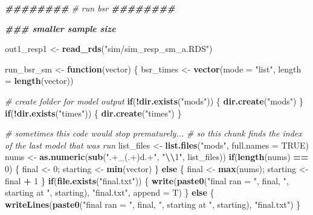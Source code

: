\documentclass[12pt, twoside]{amherstthesis}
\newenvironment{Shaded}{\begin{snugshade}}{\end{snugshade}}
\newcommand{\AttributeTok}[1]{\textcolor[rgb]{0.13,0.29,0.53}{#1}}
\newcommand{\CommentTok}[1]{\textcolor[rgb]{0.56,0.35,0.01}{\textit{#1}}}
\newcommand{\ConstantTok}[1]{\textcolor[rgb]{0.56,0.35,0.01}{#1}}
\newcommand{\ControlFlowTok}[1]{\textcolor[rgb]{0.13,0.29,0.53}{\textbf{#1}}}
\newcommand{\DecValTok}[1]{\textcolor[rgb]{0.00,0.00,0.81}{#1}}
\newcommand{\DocumentationTok}[1]{\textcolor[rgb]{0.56,0.35,0.01}{\textbf{\textit{#1}}}}
\newcommand{\FunctionTok}[1]{\textcolor[rgb]{0.13,0.29,0.53}{\textbf{#1}}}
\newcommand{\NormalTok}[1]{#1}
\newcommand{\OtherTok}[1]{\textcolor[rgb]{0.56,0.35,0.01}{#1}}
\newcommand{\SpecialCharTok}[1]{\textcolor[rgb]{0.81,0.36,0.00}{\textbf{#1}}}
\newcommand{\StringTok}[1]{\textcolor[rgb]{0.31,0.60,0.02}{#1}}
\begin{document}
\scriptsize
\begin{Shaded}
\begin{Highlighting}[]
\DocumentationTok{\#\#\#\#\#\#\#\#}
\CommentTok{\# run bsr}
\DocumentationTok{\#\#\#\#\#\#\#\#}

\DocumentationTok{\#\#\# smaller sample size}

\NormalTok{out1\_resp1 }\OtherTok{\textless{}{-}} \FunctionTok{read\_rds}\NormalTok{(}\StringTok{"sim/sim\_resp\_sm\_a.RDS"}\NormalTok{)}

\NormalTok{run\_bsr\_sm }\OtherTok{\textless{}{-}} \ControlFlowTok{function}\NormalTok{(vector) \{}
\NormalTok{  bsr\_times }\OtherTok{\textless{}{-}} \FunctionTok{vector}\NormalTok{(}\AttributeTok{mode =} \StringTok{"list"}\NormalTok{, }\AttributeTok{length =} \FunctionTok{length}\NormalTok{(vector))}
  
  \CommentTok{\# create folder for model output}
  \ControlFlowTok{if}\NormalTok{(}\SpecialCharTok{!}\FunctionTok{dir.exists}\NormalTok{(}\StringTok{"mods"}\NormalTok{)) \{}
    \FunctionTok{dir.create}\NormalTok{(}\StringTok{"mods"}\NormalTok{)}
\NormalTok{  \}}
  \ControlFlowTok{if}\NormalTok{(}\SpecialCharTok{!}\FunctionTok{dir.exists}\NormalTok{(}\StringTok{"times"}\NormalTok{)) \{}
    \FunctionTok{dir.create}\NormalTok{(}\StringTok{"times"}\NormalTok{)}
\NormalTok{  \}}
  
  \CommentTok{\# sometimes this code would stop prematurely...}
  \CommentTok{\# so this chunk finds the index of the last model that was run}
\NormalTok{  list\_files }\OtherTok{\textless{}{-}} \FunctionTok{list.files}\NormalTok{(}\StringTok{"mods"}\NormalTok{, }\AttributeTok{full.names =} \ConstantTok{TRUE}\NormalTok{)}
\NormalTok{  nums }\OtherTok{\textless{}{-}} \FunctionTok{as.numeric}\NormalTok{(}\FunctionTok{sub}\NormalTok{(}\StringTok{".+\_(.+)d.+"}\NormalTok{, }\StringTok{"}\SpecialCharTok{\textbackslash{}\textbackslash{}}\StringTok{1"}\NormalTok{, list\_files))}
  \ControlFlowTok{if}\NormalTok{(}\FunctionTok{length}\NormalTok{(nums) }\SpecialCharTok{==} \DecValTok{0}\NormalTok{) \{}
\NormalTok{    final }\OtherTok{\textless{}{-}} \DecValTok{0}\NormalTok{; starting }\OtherTok{\textless{}{-}} \FunctionTok{min}\NormalTok{(vector)}
\NormalTok{  \} }\ControlFlowTok{else}\NormalTok{ \{}
\NormalTok{    final }\OtherTok{\textless{}{-}} \FunctionTok{max}\NormalTok{(nums); starting }\OtherTok{\textless{}{-}}\NormalTok{ final }\SpecialCharTok{+} \DecValTok{1}
\NormalTok{  \}}
  \ControlFlowTok{if}\NormalTok{(}\FunctionTok{file.exists}\NormalTok{(}\StringTok{"final.txt"}\NormalTok{)) \{}
    \FunctionTok{write}\NormalTok{(}\FunctionTok{paste0}\NormalTok{(}\StringTok{"final ran = "}\NormalTok{, final, }\StringTok{", starting at "}\NormalTok{, starting), }\StringTok{"final.txt"}\NormalTok{, }\AttributeTok{append =}\NormalTok{ T)}
\NormalTok{  \} }\ControlFlowTok{else}\NormalTok{ \{}
    \FunctionTok{writeLines}\NormalTok{(}\FunctionTok{paste0}\NormalTok{(}\StringTok{"final ran = "}\NormalTok{, final, }\StringTok{", starting at "}\NormalTok{, starting), }\StringTok{"final.txt"}\NormalTok{)}
\NormalTok{  \}}
  

\end{Highlighting}
\end{Shaded}
\end{document}
